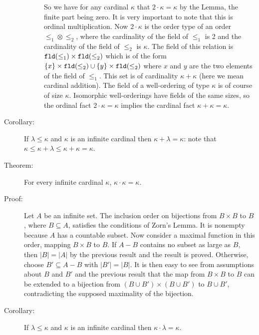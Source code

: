 \documentclass[12pt]{book}
\begin{document}
\begin{description}
\begin{description}
So we have for any cardinal $\kappa$ that $2 \cdot \kappa = \kappa$ by the Lemma, the finite part being zero.  It is very important to note that this is ordinal multiplication.
Now $2 \cdot \kappa$ is the order type of an order $\leq_1 \otimes \leq_2$, where the cardinality of the field of $\leq_1$ is 2 and the cardinality of the field of $\leq_2$ is
$\kappa$.  The field of this relation is ${\tt fld}(\leq_1) \times {\tt fld}(\leq_2)$ which is of the form $\{x\} \times {\tt fld}(\leq_2) \cup \{y\} \times {\tt fld}(\leq_2)$ where
$x$ and $y$ are the two elements of the field of $\leq_1$.  This set is of cardinality $\kappa+\kappa$ (here we mean cardinal addition).  The field of a well-ordering of type $\kappa$ is of course of size $\kappa$.  Isomorphic well-orderings have fields of the same sizes, so the ordinal fact $2 \cdot \kappa = \kappa$ implies the cardinal fact $\kappa+\kappa=\kappa$.

\end{description}

\item[Corollary:]  If $\lambda\leq \kappa$ and $\kappa$ is an infinite cardinal
then $\kappa+\lambda=\kappa$:  note that $\kappa \leq \kappa+\lambda \leq \kappa+\kappa=\kappa$.



\item[Theorem:] For every infinite cardinal $\kappa$,
$\kappa\cdot\kappa = \kappa$.

\item[Proof:] Let $A$ be an infinite set.  The inclusion order on
bijections from $B\times B$ to $B$, where $B \subseteq A$, satisfies
the conditions of Zorn's Lemma.  It is nonempty because $A$ has a
countable subset.  Now consider a maximal function in this order,
mapping $B \times B$ to $B$.  If $A-B$ contains no subset as large as
$B$, then $|B| = |A|$ by the previous result and the result is proved.
Otherwise, choose $B' \subseteq A-B$ with $|B'| = |B|$.  It is then
easy to see from assumptions about $B$ and $B'$ and the previous
result that the map from $B \times B$ to $B$ can be extended to a
bijection from $(B \cup B') \times (B \cup B')$ to $B \cup B'$,
contradicting the supposed maximality of the bijection.

\item[Corollary:]  If $\lambda\leq \kappa$ and $\kappa$ is an infinite cardinal
then $\kappa\cdot\lambda=\kappa$.



\end{description}
\end{document}
